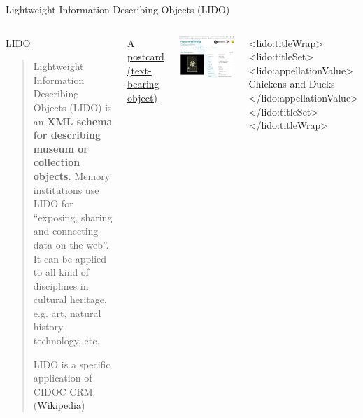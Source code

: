 \begin{frame}[fragile]{Lightweight Information Describing Objects (LIDO)}
\begin{columns}
\begin{block}{LIDO}
\begin{quote}
    Lightweight Information Describing Objects (LIDO) is an\textbf{ XML schema for describing museum or collection objects.} Memory institutions use LIDO for ``exposing, sharing and connecting data on the web''. It can be applied to all kind of disciplines in cultural heritage, e.g. art, natural history, technology, etc. 
    
    LIDO is a specific application of CIDOC CRM. (\href{https://en.wikipedia.org/wiki/LIDO}{Wikipedia})
\end{quote}
\end{block}
\small 
\href{http://gams.uni-graz.at/o:gm.1760}{A postcard (text-bearing object)}

\includegraphics[width=\textwidth]{img/text-bearing-objects.png}

\begin{xmlcode}
<lido:titleWrap>
    <lido:titleSet>
        <lido:appellationValue>
            Chickens and Ducks
        </lido:appellationValue>
    </lido:titleSet>
</lido:titleWrap>
\end{xmlcode}
\end{columns}
\end{frame}



